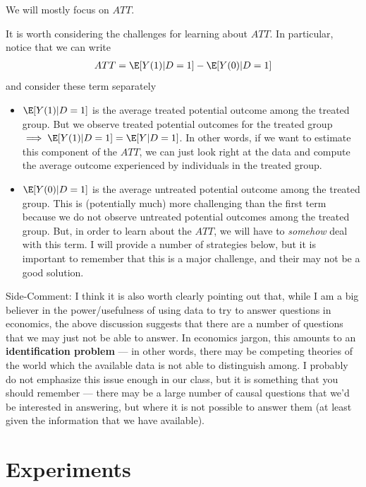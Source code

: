 \documentclass[
  letterpaper,
  DIV=11,
  numbers=noendperiod]{scrreprt}
\begin{document}
We will mostly focus on \(ATT\).

It is worth considering the challenges for learning about \(ATT\). In
particular, notice that we can write \begin{align*}
  ATT = \E[Y(1)|D=1] - \E[Y(0)|D=1]
\end{align*} and consider these term separately

\begin{itemize}
\item
  \(\E[Y(1)|D=1]\) is the average treated potential outcome among the
  treated group. But we observe treated potential outcomes for the
  treated group \(\implies \E[Y(1)|D=1] = \E[Y|D=1]\). In other words,
  if we want to estimate this component of the \(ATT\), we can just look
  right at the data and compute the average outcome experienced by
  individuals in the treated group.
\item
  \(\E[Y(0)|D=1]\) is the average untreated potential outcome among the
  treated group. This is (potentially much) more challenging than the
  first term because we do not observe untreated potential outcomes
  among the treated group. But, in order to learn about the \(ATT\), we
  will have to \emph{somehow} deal with this term. I will provide a
  number of strategies below, but it is important to remember that this
  is a major challenge, and their may not be a good solution.
\end{itemize}

{Side-Comment:} I think it is also worth clearly pointing out that,
while I am a big believer in the power/usefulness of using data to try
to answer questions in economics, the above discussion suggests that
there are a number of questions that we may just not be able to answer.
In economics jargon, this amounts to an \textbf{identification problem}
--- in other words, there may be competing theories of the world which
the available data is not able to distinguish among. I probably do not
emphasize this issue enough in our class, but it is something that you
should remember --- there may be a large number of causal questions that
we'd be interested in answering, but where it is not possible to answer
them (at least given the information that we have available).


\chapter{Experiments}\label{experiments}
\end{document}
